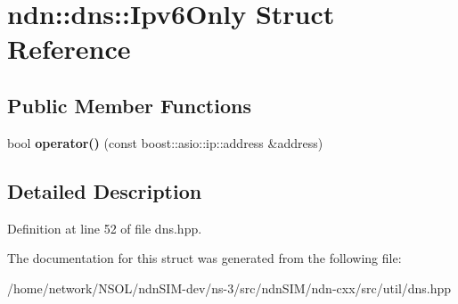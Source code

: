 \hypertarget{structndn_1_1dns_1_1Ipv6Only}{}\section{ndn\+:\+:dns\+:\+:Ipv6\+Only Struct Reference}
\label{structndn_1_1dns_1_1Ipv6Only}
\subsection*{Public Member Functions}
\begin{DoxyCompactItemize}
\item 
bool {\bfseries operator()} (const boost\+::asio\+::ip\+::address \&address)\hypertarget{structndn_1_1dns_1_1Ipv6Only_a61c75cc0bcdb437faee837b055fc5d42}{}\label{structndn_1_1dns_1_1Ipv6Only_a61c75cc0bcdb437faee837b055fc5d42}

\end{DoxyCompactItemize}


\subsection{Detailed Description}


Definition at line 52 of file dns.\+hpp.



The documentation for this struct was generated from the following file\+:\begin{DoxyCompactItemize}
\item 
/home/network/\+N\+S\+O\+L/ndn\+S\+I\+M-\/dev/ns-\/3/src/ndn\+S\+I\+M/ndn-\/cxx/src/util/dns.\+hpp\end{DoxyCompactItemize}
